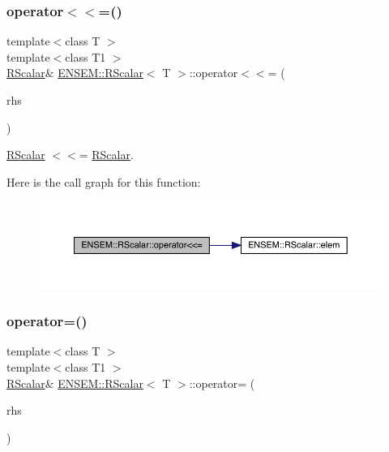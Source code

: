 \subsubsection{\texorpdfstring{operator$<$$<$=()}{operator<<=()}\hspace{0.1cm}{\footnotesize\ttfamily [2/2]}}
{\footnotesize\ttfamily template$<$class T $>$ \\
template$<$class T1 $>$ \\
\mbox{\hyperlink{classENSEM_1_1RScalar}{R\+Scalar}}\& \mbox{\hyperlink{classENSEM_1_1RScalar}{E\+N\+S\+E\+M\+::\+R\+Scalar}}$<$ T $>$\+::operator$<$$<$= (\begin{DoxyParamCaption}\item[{const \mbox{\hyperlink{classENSEM_1_1RScalar}{R\+Scalar}}$<$ T1 $>$ \&}]{rhs }\end{DoxyParamCaption})\hspace{0.3cm}{\ttfamily [inline]}}



\mbox{\hyperlink{classENSEM_1_1RScalar}{R\+Scalar}} $<$$<$= \mbox{\hyperlink{classENSEM_1_1RScalar}{R\+Scalar}}. 

Here is the call graph for this function\+:
\nopagebreak
\begin{figure}[H]
\begin{center}
\leavevmode
\includegraphics[width=350pt]{d0/d8c/classENSEM_1_1RScalar_a4f12bedac2ac4848354e3c3018f6c9aa_cgraph}
\end{center}
\end{figure}
\mbox{\label{classENSEM_1_1RScalar_a81b105339878a490866e9467135ae4fa}} 
\subsubsection{\texorpdfstring{operator=()}{operator=()}\hspace{0.1cm}{\footnotesize\ttfamily [1/2]}}
{\footnotesize\ttfamily template$<$class T $>$ \\
template$<$class T1 $>$ \\
\mbox{\hyperlink{classENSEM_1_1RScalar}{R\+Scalar}}\& \mbox{\hyperlink{classENSEM_1_1RScalar}{E\+N\+S\+E\+M\+::\+R\+Scalar}}$<$ T $>$\+::operator= (\begin{DoxyParamCaption}\item[{const \mbox{\hyperlink{classENSEM_1_1RScalar}{R\+Scalar}}$<$ T1 $>$ \&}]{rhs }\end{DoxyParamCaption})\hspace{0.3cm}{\ttfamily [inline]}}



